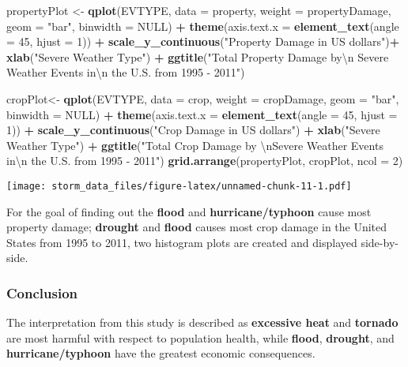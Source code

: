 \documentclass[]{article}
\newenvironment{Shaded}{\begin{snugshade}}{\end{snugshade}}
\newcommand{\KeywordTok}[1]{\textcolor[rgb]{0.13,0.29,0.53}{\textbf{#1}}}
\newcommand{\DataTypeTok}[1]{\textcolor[rgb]{0.13,0.29,0.53}{#1}}
\newcommand{\DecValTok}[1]{\textcolor[rgb]{0.00,0.00,0.81}{#1}}
\newcommand{\CharTok}[1]{\textcolor[rgb]{0.31,0.60,0.02}{#1}}
\newcommand{\StringTok}[1]{\textcolor[rgb]{0.31,0.60,0.02}{#1}}
\newcommand{\OtherTok}[1]{\textcolor[rgb]{0.56,0.35,0.01}{#1}}
\newcommand{\OperatorTok}[1]{\textcolor[rgb]{0.81,0.36,0.00}{\textbf{#1}}}
\newcommand{\NormalTok}[1]{#1}
\begin{document}
\begin{Shaded}
\begin{Highlighting}[]
\NormalTok{propertyPlot <-}\StringTok{ }\KeywordTok{qplot}\NormalTok{(EVTYPE, }\DataTypeTok{data =}\NormalTok{ property, }\DataTypeTok{weight =}\NormalTok{ propertyDamage, }\DataTypeTok{geom =} \StringTok{"bar"}\NormalTok{, }\DataTypeTok{binwidth =} \OtherTok{NULL}\NormalTok{) }\OperatorTok{+}\StringTok{ }
\StringTok{    }\KeywordTok{theme}\NormalTok{(}\DataTypeTok{axis.text.x =} \KeywordTok{element_text}\NormalTok{(}\DataTypeTok{angle =} \DecValTok{45}\NormalTok{, }\DataTypeTok{hjust =} \DecValTok{1}\NormalTok{)) }\OperatorTok{+}\StringTok{ }\KeywordTok{scale_y_continuous}\NormalTok{(}\StringTok{"Property Damage in US dollars"}\NormalTok{)}\OperatorTok{+}\StringTok{ }
\StringTok{    }\KeywordTok{xlab}\NormalTok{(}\StringTok{"Severe Weather Type"}\NormalTok{) }\OperatorTok{+}\StringTok{ }\KeywordTok{ggtitle}\NormalTok{(}\StringTok{"Total Property Damage by}\CharTok{\textbackslash{}n}\StringTok{ Severe Weather Events in}\CharTok{\textbackslash{}n}\StringTok{ the U.S. from 1995 - 2011"}\NormalTok{)}

\NormalTok{cropPlot<-}\StringTok{ }\KeywordTok{qplot}\NormalTok{(EVTYPE, }\DataTypeTok{data =}\NormalTok{ crop, }\DataTypeTok{weight =}\NormalTok{ cropDamage, }\DataTypeTok{geom =} \StringTok{"bar"}\NormalTok{, }\DataTypeTok{binwidth =} \OtherTok{NULL}\NormalTok{) }\OperatorTok{+}\StringTok{ }
\StringTok{    }\KeywordTok{theme}\NormalTok{(}\DataTypeTok{axis.text.x =} \KeywordTok{element_text}\NormalTok{(}\DataTypeTok{angle =} \DecValTok{45}\NormalTok{, }\DataTypeTok{hjust =} \DecValTok{1}\NormalTok{)) }\OperatorTok{+}\StringTok{ }\KeywordTok{scale_y_continuous}\NormalTok{(}\StringTok{"Crop Damage in US dollars"}\NormalTok{) }\OperatorTok{+}\StringTok{ }
\StringTok{    }\KeywordTok{xlab}\NormalTok{(}\StringTok{"Severe Weather Type"}\NormalTok{) }\OperatorTok{+}\StringTok{ }\KeywordTok{ggtitle}\NormalTok{(}\StringTok{"Total Crop Damage by }\CharTok{\textbackslash{}n}\StringTok{Severe Weather Events in}\CharTok{\textbackslash{}n}\StringTok{ the U.S. from 1995 - 2011"}\NormalTok{)}
\KeywordTok{grid.arrange}\NormalTok{(propertyPlot, cropPlot, }\DataTypeTok{ncol =} \DecValTok{2}\NormalTok{)}
\end{Highlighting}
\end{Shaded}

\texttt{[image: storm\_data\_files/figure-latex/unnamed-chunk-11-1.pdf]}

For the goal of finding out the \textbf{flood} and
\textbf{hurricane/typhoon} cause most property damage; \textbf{drought}
and \textbf{flood} causes most crop damage in the United States from
1995 to 2011, two histogram plots are created and displayed
side-by-side.

\subsubsection{Conclusion}\label{conclusion}

The interpretation from this study is described as \textbf{excessive
heat} and \textbf{tornado} are most harmful with respect to population
health, while \textbf{flood}, \textbf{drought}, and
\textbf{hurricane/typhoon} have the greatest economic consequences.
\end{document}

